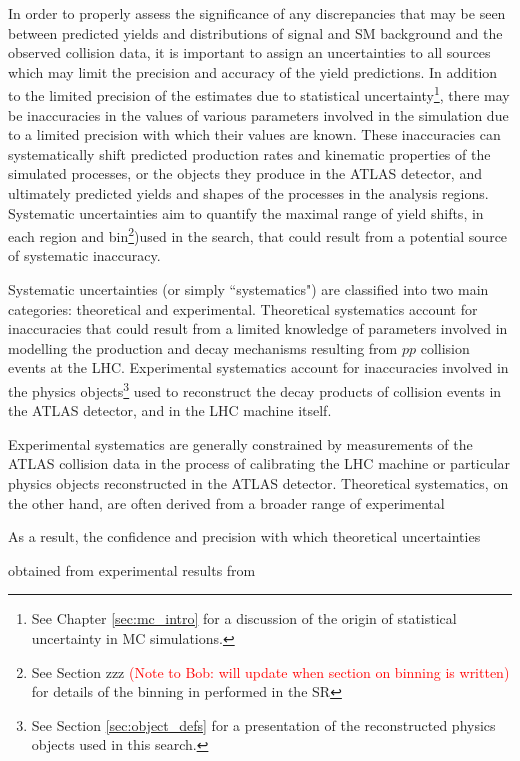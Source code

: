 \label{chapter:systematics}

In order to properly assess the significance of any discrepancies that may be seen between predicted yields and distributions of signal and SM background and the observed collision data, it is important to assign an uncertainties to all sources which may limit the precision and accuracy of the yield predictions. In addition to the limited precision of the estimates due to statistical uncertainty\footnote{See Chapter \ref{sec:mc_intro} for a discussion of the origin of statistical uncertainty in MC simulations.}, there may be inaccuracies in the values of various parameters involved in the simulation due to a limited precision with which their values are known. These inaccuracies can systematically shift predicted production rates and kinematic properties of the simulated processes, or the objects they produce in the ATLAS detector, and ultimately predicted yields and shapes of the processes in the analysis regions. Systematic uncertainties aim to quantify the maximal range of yield shifts, in each region and bin\footnote{See Section zzz \textcolor{red}{(Note to Bob: will update when section on binning is written)} for details of the binning in \minms performed in the SR})used in the search, that could result from a potential source of systematic inaccuracy. 

Systematic uncertainties (or simply ``systematics") are classified into two main categories: theoretical and experimental. Theoretical systematics account for inaccuracies that could result from a limited knowledge of parameters involved in modelling the production and decay mechanisms resulting from \(pp\) collision events at the LHC. Experimental systematics account for inaccuracies involved in the physics objects\footnote{See Section \ref{sec:object_defs} for a presentation of the reconstructed physics objects used in this search.} used to reconstruct the decay products of collision events in the ATLAS detector, and in the LHC machine itself. 

Experimental systematics are generally constrained by measurements of the ATLAS collision data in the process of calibrating the LHC machine or particular physics objects reconstructed in the ATLAS detector. Theoretical systematics, on the other hand, are often derived from a broader range of experimental 

 As a result, the confidence and precision with which theoretical uncertainties 

 obtained from experimental results from 

